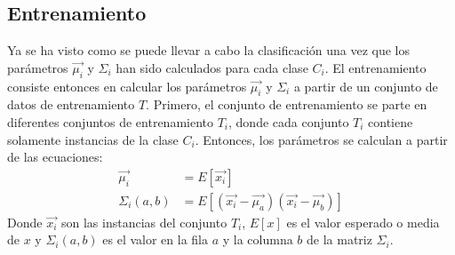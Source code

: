 \documentclass[a4paper, 11pt, oneside]{report}
\begin{document}
\subsection{Entrenamiento}
Ya se ha visto como se puede llevar a cabo la clasificación una vez que los parámetros $\vec{\mu_i}$ y $\Sigma_i$ han sido calculados para cada clase $C_i$. El entrenamiento consiste entonces en calcular los parámetros $\vec{\mu_i}$ y $\Sigma_i$ a partir de un conjunto de datos de entrenamiento $T$. Primero, el conjunto de entrenamiento se parte en diferentes conjuntos de entrenamiento $T_i$, donde cada conjunto $T_i$ contiene solamente instancias de la clase $C_i$. Entonces, los parámetros se calculan a partir de las ecuaciones:
\begin{equation}\label{eq:multiParams}
\begin{aligned}
\vec{\mu_i} &= E[ \vec{x_i} ] \\
\Sigma_i(a,b) &= E[ (\vec{x_i}-\vec{\mu_a})(\vec{x_i}-\vec{\mu_b}) ]
\end{aligned}
\end{equation}
Donde $\vec{x_i}$ son las instancias del conjunto $T_i$, $E[x]$ es el valor esperado o media de $x$ y $\Sigma_i(a,b)$ es el valor en la fila $a$ y la columna $b$ de la matriz $\Sigma_i$.
\end{document}
